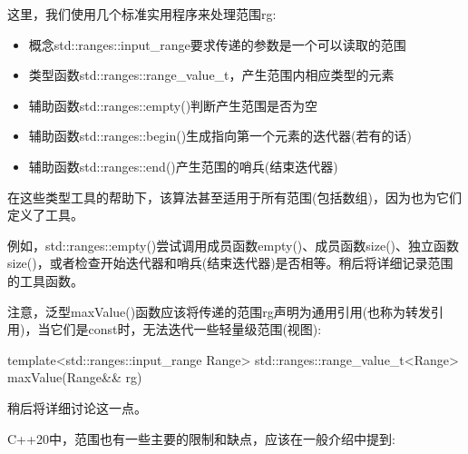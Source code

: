 这里，我们使用几个标准实用程序来处理范围rg:

\begin{itemize}
\item
概念std::ranges::input\_range要求传递的参数是一个可以读取的范围

\item
类型函数std::ranges::range\_value\_t，产生范围内相应类型的元素

\item
辅助函数std::ranges::empty()判断产生范围是否为空

\item
辅助函数std::ranges::begin()生成指向第一个元素的迭代器(若有的话)

\item
辅助函数std::ranges::end()产生范围的哨兵(结束迭代器)
\end{itemize}

在这些类型工具的帮助下，该算法甚至适用于所有范围(包括数组)，因为也为它们定义了工具。

例如，std::ranges::empty()尝试调用成员函数empty()、成员函数size()、独立函数size()，或者检查开始迭代器和哨兵(结束迭代器)是否相等。稍后将详细记录范围的工具函数。

注意，泛型maxValue()函数应该将传递的范围rg声明为通用引用(也称为转发引用)，当它们是const时，无法迭代一些轻量级范围(视图):

\begin{cpp}
template<std::ranges::input_range Range>
std::ranges::range_value_t<Range> maxValue(Range&& rg)
\end{cpp}

稍后将详细讨论这一点。


C++20中，范围也有一些主要的限制和缺点，应该在一般介绍中提到:

